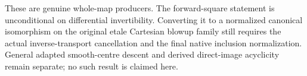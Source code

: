 \begin{remark}
These are genuine whole-map producers. The forward-square statement is
unconditional on differential invertibility. Converting it to a normalized
canonical isomorphism on the original etale Cartesian blowup family still
requires the actual inverse-transport cancellation and the final native
inclusion normalization. General adapted smooth-centre descent and derived
direct-image acyclicity remain separate; no such result is claimed here.
\end{remark}
